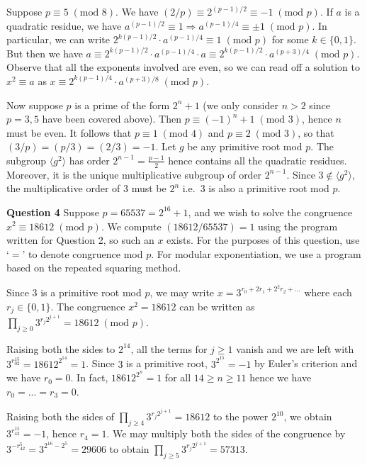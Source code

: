 \documentclass[12pt]{article}
\newcommand{\textmod}[1]{\;(\text{mod }#1)}
\begin{document}
Suppose \(p\equiv 5\textmod{8}\). We have \((2/p) \equiv
2^{(p-1)/2}\equiv -1 \textmod{p}\). If \(a\) is a quadratic residue, we have
\(a^{(p-1)/2}\equiv 1 \Rightarrow a^{(p-1)/4}\equiv \pm 1 \textmod{p}\). In
particular, we can write \( 2^{k(p-1)/2} \cdot a^{(p-1)/4}\equiv 1 \textmod{p}\) for some \(k\in
\{0,1\}\). But then we have \(a \equiv 2^{k(p-1)/2} \cdot a^{(p-1)/4}\cdot a \equiv
2^{k(p-1)/2}\cdot a^{(p+3)/4} \textmod{p}\). Observe that all the exponents
involved are even, so we can read off a solution to \(x^2\equiv a\) as \(x\equiv
2^{k(p-1)/4}\cdot a^{(p+3)/8}\textmod{p}\).

\hfill 

Now suppose \(p\) is a prime of the form \(2^n+1\) (we only consider \(n>2\)
since \(p=3,5\) have been covered above). Then \(p\equiv (-1)^n+1\textmod{3}\),
hence \(n\) must be even. It follows that \(p\equiv 1\textmod{4}\) and \(p\equiv
2\textmod{3}\), so that \((3/p) = (p/3) = (2/3) = -1\). Let \(g\) be any
primitive root mod \(p\). The subgroup \(\langle g^2\rangle\) has order
\(2^{n-1}=\frac{p-1}{2}\) hence contains all the quadratic residues. Moreover,
it is the unique multiplicative subgroup of order \(2^{n-1}\). Since \(3\notin
\langle g^2\rangle\), the multiplicative order of \(3\) must be \(2^n\) i.e.\
\(3\) is also a primitive root mod \(p\). 

\textbf{Question 4}\quad
Suppose \(p=65537=2^{16}+1\), and we wish to solve the congruence \(x^2\equiv
18612 \textmod{p}\). We compute \((18612/65537)=1\) using the program written
for Question 2, so such an \(x\) exists. For the purposes of this question, use
`\(=\)' to denote congruence mod \(p\). For modular exponentiation, we use a
program based on the repeated squaring method.

Since \(3\) is a primitive root mod \(p\), we may write \(x =
3^{r_0+2r_1+2^2r_2+...}\) where each \(r_j\in \{0,1\}\). The congruence
\(x^2=18612\) can be written as \(\prod_{j\geq 0} 3^{r_j2^{j+1}} = 18612
\textmod{p}\). 

Raising both the sides to \(2^{14}\), all the terms for \(j\geq 1\) vanish and
we are left with \(3^{r_02^{15}}= 18612^{2^{14}} = 1\). Since \(3\) is a
primitive root, \(3^{2^{15}} = -1\) by Euler's criterion and we have \(r_0=0\).
In fact, \(18612^{2^n}=1\) for all \(14\geq n\geq 11\) hence we have \(r_0=...=r_3 =
0\). 

Raising both the sides of \(\prod_{j\geq 4}3^{r_j2^{j+1}}=18612\) to the power
\(2^{10}\), we obtain \(3^{r_42^{15}}=-1\), hence \(r_4 = 1\). We may multiply
both the sides of the congruence by \(3^{-r_42^5} = 3^{2^{16}-2^5} = 29606\) to
obtain \(\prod_{j\geq 5}3^{r_j2^{j+1}}=57313.\) 
\end{document}
